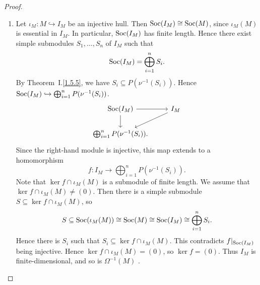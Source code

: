 \begin{proof}\
\begin{enumerate}
\item Let $\iota_M: M\hookrightarrow I_M$ be an injective hull. Then $\operatorname{Soc}(I_M) \cong \operatorname{Soc}(M)$, since $\iota _M(M)$
  is essential in $I_M$. In particular, $\operatorname{Soc}(I_M)$ has finite length. Hence
  there exist simple submodules $S_1,\ldots,S_n$ of $I_M$ such that
	\[
		\operatorname{Soc}(I_M) = \bigoplus_{i=1}^n S_i.
	\]
  By Theorem~I.\ref{1.5.5}, we have $S_i \subseteq P(\nu^{-1}(S_i))$. Hence
  $\operatorname{Soc}(I_M) \hookrightarrow \bigoplus_{i=1}^n P(\nu^{-1}(S_i))$.
\[
\begin{tikzcd}
\Soc(I_M) \ar[r] \ar[d] & I_M \ar[dl] \\
\bigoplus_{i=1}^n P(\nu^{-1}(S_i)).
\end{tikzcd}
\]
  Since the right-hand module is injective, this
  map extends to a homomorphism
  \[
  f:I_M\to \bigoplus_{i=1}^n P(\nu^{-1}(S_i)).
  \]
  Note that $\ker f \cap
  \iota _M(M)$ is a submodule of finite length. We assume that $\ker f \cap \iota _M(M) \neq  (0)$. Then there is a simple submodule $S \subseteq \ker f \cap \iota _M(M)$, so
  \[
   S \subseteq \operatorname{Soc}(\iota _M(M)) \cong 
    \operatorname{Soc}(M) \cong  \operatorname{Soc}(I_M) \cong  \bigoplus_{i=1}^n S_i.
  \]
  Hence there is $S_i$ such that $S_i \subseteq \ker f \cap \iota _M(M)$.
  This contradicts ${f}|_{\operatorname{Soc}(I_M)}$ being injective.
  Hence $\ker f \cap \iota _M(M) = (0)$, so $\ker f =
  (0)$. Thus $I_M$ is finite-dimensional, and so is $\Omega^{-1}(M)$ .


\end{enumerate}
\end{proof}
